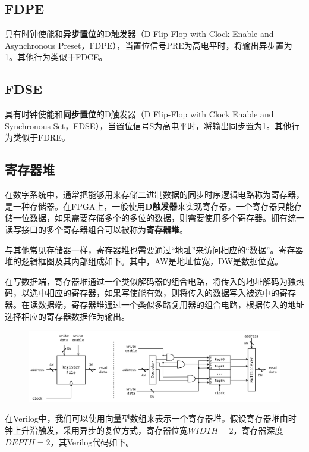 \documentclass{ctexart}
\begin{document}
\subsection{FDPE}
具有时钟使能和\textbf{异步置位}的D触发器（D Flip-Flop with Clock Enable and Asynchronous Preset，FDPE），当置位信号PRE为高电平时，将输出异步置为1。其他行为类似于FDCE。

\subsection{FDSE}
具有时钟使能和\textbf{同步置位}的D触发器（D Flip-Flop with Clock Enable and Synchronous Set，FDSE），当置位信号S为高电平时，将输出同步置为1。其他行为类似于FDRE。

\subsection{寄存器堆}

在数字系统中，通常把能够用来存储二进制数据的同步时序逻辑电路称为寄存器，是一种存储器。在FPGA上，一般使用\textbf{D触发器}来实现寄存器。一个寄存器只能存储一位数据，如果需要存储多个的多位的数据，则需要使用多个寄存器。拥有统一读写接口的多个寄存器组合可以被称为\textbf{寄存器堆}。

与其他常见存储器一样，寄存器堆也需要通过“地址”来访问相应的“数据”。寄存器堆的逻辑框图及其内部组成如下。其中，AW是地址位宽，DW是数据位宽。

在写数据端，寄存器堆通过一个类似解码器的组合电路，将传入的地址解码为独热码，以选中相应的寄存器，如果写使能有效，则将传入的数据写入被选中的寄存器。在读数据端，寄存器堆通过一个类似多路复用器的组合电路，根据传入的地址选择相应的寄存器数据作为输出。

\begin{figure}[H]
    \centering
    \includegraphics[width=\textwidth]{lab3/3.png}
\end{figure}

在Verilog中，我们可以使用向量型数组来表示一个寄存器堆。假设寄存器堆由时钟上升沿触发，采用异步的复位方式，寄存器位宽$WIDTH=2$，寄存器深度$DEPTH=2$，其Verilog代码如下。
\end{document}
